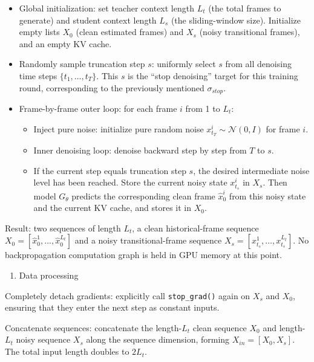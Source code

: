 \begin{itemize}
\tightlist
\item
  Global initialization: set teacher context length \(L_t\) (the total frames to generate) and student context length \(L_s\) (the sliding-window size). Initialize empty lists \(X_0\) (clean estimated frames) and \(X_s\) (noisy transitional frames), and an empty KV cache.
\item
  Randomly sample truncation step \(s\): uniformly select \(s\) from all denoising time steps \(\{t_1,\ldots,t_T\}\). This \(s\) is the ``stop denoising'' target for this training round, corresponding to the previously mentioned \(\sigma_{stop}\).
\item
{}
  Frame-by-frame outer loop: for each frame \(i\) from 1 to \(L_t\):

  \begin{itemize}
  \tightlist
  \item
    Inject pure noise: initialize pure random noise \(x_{t_T}^{i}\sim\mathcal{N}(0,I)\) for frame \(i\).
  \item
    Inner denoising loop: denoise backward step by step from \(T\) to \(s\).
  \item
    If the current step equals truncation step \(s\), the desired intermediate noise level has been reached. Store the current noisy state \(x_{t_s}^{i}\) in \(X_s\). Then model \(G_\theta\) predicts the corresponding clean frame \(\hat{x}_0^i\) from this noisy state and the current KV cache, and stores it in \(X_0\).
  \end{itemize}
\end{itemize}

Result: two sequences of length \(L_t\), a clean historical-frame sequence \(X_0=[\hat{x}_0^1,\ldots,\hat{x}_0^{L_t}]\) and a noisy transitional-frame sequence \(X_s=[x_{t_s}^1,\ldots,x_{t_s}^{L_t}]\). No backpropagation computation graph is held in GPU memory at this point.

\begin{enumerate}
\def\labelenumi{\arabic{enumi}.}
\setcounter{enumi}{1}
\tightlist
\item
  Data processing
\end{enumerate}

Completely detach gradients: explicitly call \texttt{stop\_grad()} again on \(X_s\) and \(X_0\), ensuring that they enter the next step as constant inputs.

Concatenate sequences: concatenate the length-\(L_t\) clean sequence \(X_0\) and length-\(L_t\) noisy sequence \(X_s\) along the sequence dimension, forming \(X_{in}=[X_0,X_s]\). The total input length doubles to \(2L_t\).

